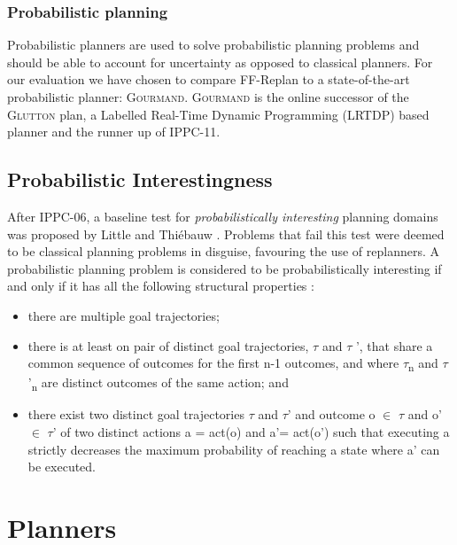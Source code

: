 \documentclass[runningheads,a4paper]{llncs}
\begin{document}
\subsubsection{Probabilistic planning}
Probabilistic planners are used to solve probabilistic planning problems and should be able to account for uncertainty as opposed to classical planners. For our evaluation we have chosen to compare FF-Replan to a state-of-the-art probabilistic planner: \textsc{Gourmand}. \textsc{Gourmand} is the online successor of the \textsc{Glutton} plan, a Labelled Real-Time Dynamic Programming (LRTDP) based planner and the runner up of IPPC-11.

\subsection{Probabilistic Interestingness}
After IPPC-06, a baseline test for \emph{probabilistically interesting} planning domains was proposed by Little and Thi\'ebauw \cite{little2007probvsreplan}.  Problems that fail this test were deemed to be classical planning problems in disguise, favouring the use of replanners. A probabilistic planning problem is considered to be probabilistically interesting if and only if it has all the following structural properties \cite{little2007probvsreplan}:

\begin{itemize}
	\item there are multiple goal trajectories;
	\item there is at least on pair of distinct goal trajectories, $\tau$ and $\tau$ ', that share a common sequence of outcomes for the first n-1 outcomes, and where $\tau$\textsubscript{n} and $\tau$'\textsubscript{n} are distinct outcomes of the same action; and
	\item there exist two distinct goal trajectories $\tau$ and $\tau$' and outcome o $\in$ $\tau$ and o' $\in$ $\tau$' of two distinct actions a = act(o) and a'= act(o') such that executing a strictly decreases the maximum probability of reaching a state where a' can be executed.
\end{itemize}


\section{Planners}
\label{sec:planners}
\end{document}
